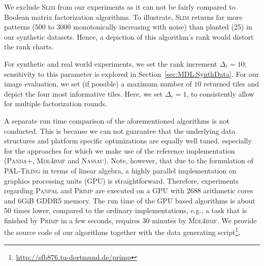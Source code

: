 We exclude \textsc{Slim} from our experiments as it can not be fairly compared to Boolean matrix factorization algorithms. To illustrate, \textsc{Slim} returns far more patterns ($500$ to $3000$ monotonically increasing with noise) than planted (25) in our synthetic datasets. Hence, a depiction of this algorithm's rank would distort the rank charts.

For synthetic and real world experiments, we set the rank increment $\Delta_r=10$; sensitivity to this parameter is explored in Section~\ref{sec:MDL:SynthData}. For our image evaluation, we set (if possible) a maximum number of $10$ returned tiles and depict the four most informative tiles. Here, we set $\Delta_r=1$, to consistently allow for multiple factorization rounds. 

A separate run time comparison of the aforementioned algorithms is not conducted. This is because we can not guarantee that the underlying data structures and platform specific optimizations are equally well tuned, especially for the approaches for which we make use of the reference implementation (\textsc{Panda+}, \textsc{Mdl4bmf} and \textsc{Nassau}). Note, however, that due to the formulation of \textsc{PAL-Tiling} in terms of linear algebra, a highly parallel implementation on graphics processing units (GPU) is straightforward. Therefore, experiments regarding \textsc{Panpal} and \textsc{Primp} are executed on a GPU with 2688 arithmetic cores and 6GiB GDDR5 memory. The run time of the GPU based algorithms is about 50 times lower, compared to the ordinary implementations, e.g., a task that is finished by \textsc{Primp} in a few seconds, requires 30 minutes by \textsc{Mdl4bmf}. We provide the source code of our algorithms together with the data generating script\footnote{\url{http://sfb876.tu-dortmund.de/primp}}.
